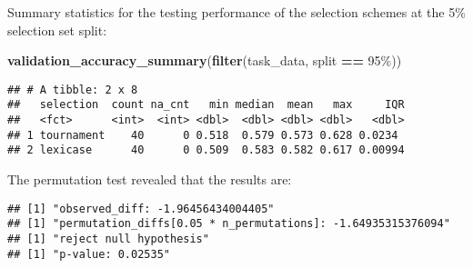 \documentclass[
]{book}
\newenvironment{Shaded}{\begin{snugshade}}{\end{snugshade}}
\newcommand{\AttributeTok}[1]{\textcolor[rgb]{0.13,0.29,0.53}{#1}}
\newcommand{\DecValTok}[1]{\textcolor[rgb]{0.00,0.00,0.81}{#1}}
\newcommand{\FunctionTok}[1]{\textcolor[rgb]{0.13,0.29,0.53}{\textbf{#1}}}
\newcommand{\NormalTok}[1]{#1}
\newcommand{\OtherTok}[1]{\textcolor[rgb]{0.56,0.35,0.01}{#1}}
\newcommand{\SpecialCharTok}[1]{\textcolor[rgb]{0.81,0.36,0.00}{\textbf{#1}}}
\newcommand{\StringTok}[1]{\textcolor[rgb]{0.31,0.60,0.02}{#1}}
\begin{document}
Summary statistics for the testing performance of the selection schemes at the 5\% selection set split:

\begin{Shaded}
\begin{Highlighting}[]
\FunctionTok{validation\_accuracy\_summary}\NormalTok{(}\FunctionTok{filter}\NormalTok{(task\_data, split }\SpecialCharTok{==} \StringTok{\textquotesingle{}95\%\textquotesingle{}}\NormalTok{))}
\end{Highlighting}
\end{Shaded}

\begin{verbatim}
## # A tibble: 2 x 8
##   selection  count na_cnt   min median  mean   max     IQR
##   <fct>      <int>  <int> <dbl>  <dbl> <dbl> <dbl>   <dbl>
## 1 tournament    40      0 0.518  0.579 0.573 0.628 0.0234 
## 2 lexicase      40      0 0.509  0.583 0.582 0.617 0.00994
\end{verbatim}

The permutation test revealed that the results are:

\begin{Shaded}
\end{Shaded}

\begin{verbatim}
## [1] "observed_diff: -1.96456434004405"
## [1] "permutation_diffs[0.05 * n_permutations]: -1.64935315376094"
## [1] "reject null hypothesis"
## [1] "p-value: 0.02535"
\end{verbatim}
\end{document}
